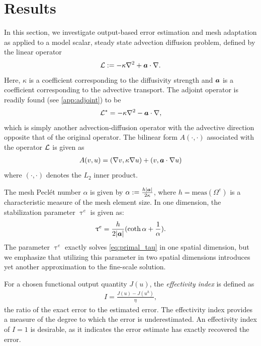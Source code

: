 \section{Results}
\label{sec:Results}

In this section, we investigate output-based error estimation and
mesh adaptation as applied to a model scalar, steady state advection
diffusion problem, defined by the linear operator
%
\begin{gather}
\mathcal{L} := -\kappa \nabla^2 + \boldsymbol{a} \cdot \nabla.
\label{eq:adv_diff}
\end{gather}
%
Here, $\kappa$ is a coefficient corresponding to the diffusivity
strength and $\boldsymbol{a}$ is a coefficient corresponding
to the advective transport. The adjoint operator is readily found
(see \ref{app:adjoint}) to be
%
\begin{gather}
\mathcal{L}^* = -\kappa \nabla^2 - \boldsymbol{a} \cdot \nabla,
\label{eq:adv_diff_adjoint}
\end{gather}
%
which is simply another advection-diffusion operator with the advective
direction opposite that of the original operator. The bilinear
form $A(\cdot, \cdot)$ associated with the operator $\mathcal{L}$ is given as
%
\begin{gather}
A(v,u) = (\nabla v, \kappa \nabla u) + (v, \boldsymbol{a} \cdot \nabla u)
\label{eq:adv_diff_bilinear}
\end{gather}
%
where $(\cdot, \cdot)$ denotes the $L_2$ inner product.

The mesh Pecl\'{e}t number $\alpha$ is given by
$\alpha := \frac{h | \boldsymbol{a} |}{2 \kappa}$, where
$h = \text{meas}(\Omega^e)$ is a characteristic measure of
the mesh element size. In one dimension, the stabilization
parameter $\uptau^e$ is given \cite{hughes1998variational} as:
%
\begin{gather}
\uptau^e = \frac{h}{2 | \boldsymbol{a} |}( \coth{\alpha} + \frac{1}{\alpha}).
\label{eq:adv_diff_tau}
\end{gather}
%
The parameter $\uptau^e$ exactly solves \eqref{eq:primal_tau}
in one spatial dimension, but we emphasize that utilizing this
parameter in two spatial dimensions introduces yet another
approximation to the fine-scale solution.

For a chosen functional output quantity $J(u)$, the
\emph{effectivity index} is defined as
%
\begin{gather}
I = \frac{J(u) - J(u^h)}{\eta},
\label{eq:effectivity}
\end{gather}
%
the ratio of the exact error to the estimated error. The effectivity
index provides a measure of the degree to which the error is
underestimated. An effectivity index of $I = 1$ is desirable, as it
indicates the error estimate has exactly recovered the error.


